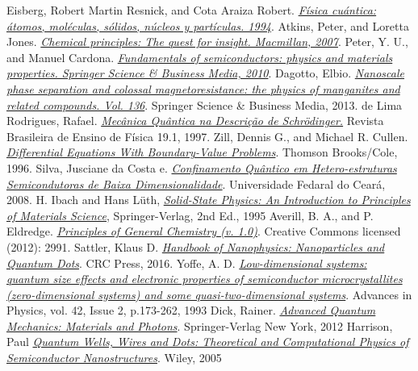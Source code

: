  Eisberg, Robert Martin Resnick, and Cota Araiza Robert. \href{http://gen.lib.rus.ec/book/index.php?md5=80CCC290E6FFF645ADF0BA24178E4C5D}\textit{Física cuántica: átomos, moléculas, sólidos, núcleos y partículas. 1994}.
  Atkins, Peter, and Loretta Jones. \href{http://gen.lib.rus.ec/book/index.php?md5=6D32E94CECA0A9BD6FFF5F1307078071}\textit{Chemical principles: The quest for insight. Macmillan, 2007}.
  Peter, Y. U., and Manuel Cardona. \href{http://gen.lib.rus.ec/book/index.php?md5=20A8507AB491C812ED2C75D08740987A}\textit{Fundamentals of semiconductors: physics and materials properties. Springer Science \& Business Media, 2010}.
  Dagotto, Elbio. \href{http://gen.lib.rus.ec/book/index.php?md5=3C621FEBFE1EBBF8B376CED188D04A84}\textit{Nanoscale phase separation and colossal magnetoresistance: the physics of manganites and related compounds. Vol. 136}. Springer Science \& Business Media, 2013.
  de Lima Rodrigues, Rafael. \href{http://sbfisica.org.br/rbef/pdf/v19_68.pdf}\textit{Mecânica Quântica na Descrição de Schrödinger.} Revista Brasileira de Ensino de Física 19.1, 1997.
  Zill, Dennis G., and Michael R. Cullen. \href{http://gen.lib.rus.ec/book/index.php?md5=8673E58CC84FED5F909BEA1CC2BC4E3F}\textit{Differential Equations With Boundary-Value Problems}. Thomson Brooks/Cole, 1996.
  Silva, Jusciane da Costa e. \href{www.repositorio.ufc.br/bitstream/riufc/12669/1/2008_tese_jcsilva.pdf}\textit{Confinamento Quântico em Hetero-estruturas Semicondutoras de Baixa Dimensionalidade}. Universidade Fedaral do Ceará, 2008.
  H. Ibach and Hans Lüth, \href{http://www.springer.com/us/book/9783540938033}\textit{Solid-State Physics: An Introduction to Principles of Materials Science}, Springer-Verlag, 2nd Ed., 1995
 Averill, B. A., and P. Eldredge. \href{https://2012books.lardbucket.org/books/principles-of-general-chemistry-v1.0m/index.html}\textit{Principles of General Chemistry (v. 1.0)}. Creative Commons licensed (2012): 2991.
 Sattler, Klaus D. \href{https://www.amazon.com/Handbook-Nanophysics-Nanoparticles-Quantum-Dots-ebook/dp/B008I9VLAI}\textit{Handbook of Nanophysics: Nanoparticles and Quantum Dots}. CRC Press, 2016.
 Yoffe, A. D. \href{http://adsabs.harvard.edu/abs/1993AdPhy..42..173Y}\textit{Low-dimensional systems: quantum size effects and electronic properties of semiconductor microcrystallites (zero-dimensional systems) and some quasi-two-dimensional systems}. Advances in Physics, vol. 42, Issue 2, p.173-262, 1993
 Dick, Rainer. \href{http://www.springer.com/us/book/9781489990686}\textit{Advanced Quantum Mechanics: Materials and Photons}. Springer-Verlag New York, 2012
 Harrison, Paul \href{http://www.wiley.com/WileyCDA/WileyTitle/productCd-0470010819.html}\textit{Quantum Wells, Wires and Dots: Theoretical and Computational Physics of Semiconductor Nanostructures}. Wiley, 2005